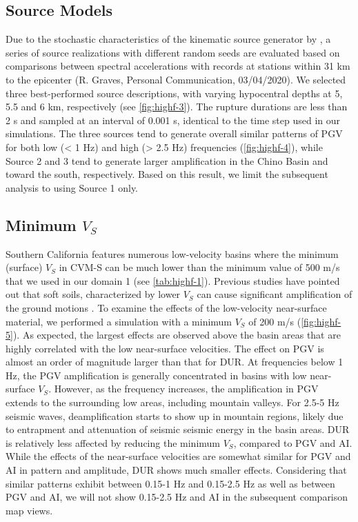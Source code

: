 \subsection{Source Models}
Due to the stochastic characteristics of the kinematic source generator by \citet{gravesKinematicGroundMotion2016}, a series of source realizations with different random seeds are evaluated based on comparisons between spectral accelerations with records at stations within 31 km to the epicenter (R. Graves, Personal Communication, 03/04/2020). We selected three best-performed source descriptions, with varying hypocentral depths at 5, 5.5 and 6 km, respectively (see \cref{fig:highf-3}). The rupture durations are less than 2 s and sampled at an interval of 0.001 s, identical to the time step used in our simulations. The three sources tend to generate overall similar patterns of PGV for both low (< 1 Hz) and high (> 2.5 Hz) frequencies (\cref{fig:highf-4}), while Source 2 and 3 tend to generate larger amplification in the Chino Basin and toward the south, respectively. Based on this result, we limit the subsequent analysis to using Source 1 only.

\subsection{Minimum \textbf{$V_S$}}
Southern California features numerous low-velocity basins where the minimum (surface) $V_S$ in CVM-S can be much lower than the minimum value of 500 m/s that we used in our domain 1 (see \cref{tab:highf-1}). Previous studies have pointed out that soft soils, characterized by lower $V_S$ can cause significant amplification of the ground motions . To examine the effects of the low-velocity near-surface material, we performed a simulation with a minimum $V_S$ of 200 m/s (\cref{fig:highf-5}). As expected, the largest effects are observed above the basin areas that are highly correlated with the low near-surface velocities. The effect on PGV is almost an order of magnitude larger than that for DUR. At frequencies below 1 Hz, the PGV amplification is generally concentrated in basins with low near-surface $V_S$. However, as the frequency increases, the amplification in PGV extends to the surrounding low areas, including mountain valleys. For 2.5-5 Hz seismic waves, deamplification starts to show up in mountain regions, likely due to entrapment and attenuation of seismic seismic energy in the basin areas. DUR is relatively less affected by reducing the minimum $V_S$, compared to PGV and AI. While the effects of the near-surface velocities are somewhat similar for PGV and AI in pattern and amplitude, DUR shows much smaller effects. Considering that similar patterns exhibit between 0.15-1 Hz and 0.15-2.5 Hz as well as between PGV and AI, we will not show 0.15-2.5 Hz and AI in the subsequent comparison map views.

